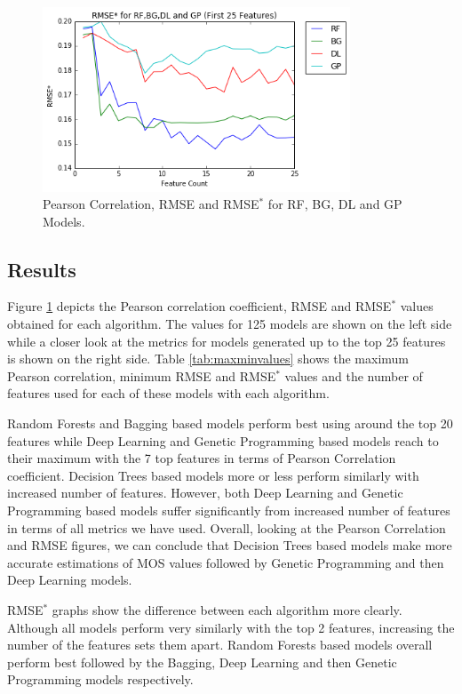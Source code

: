 \documentclass[journal]{IEEEtran}
\begin{document}
\begin{figure}[ht!]
\includegraphics[width=3.6in]{./epsilonrmsezoom.png}
\caption{Pearson Correlation, RMSE and RMSE$^*$ for RF, BG, DL and GP Models.}
\label{fig:all}
\vspace{-0.3cm}
\end{figure}

\vspace{-0.2cm}
\subsection{Results}

Figure \ref{fig:all} depicts the Pearson correlation coefficient, RMSE and RMSE$^*$ values obtained for each algorithm. The values for 125 models are shown on the left side while a closer look at the metrics for models generated up to the top 25 features is shown on the right side. Table \ref{tab:maxminvalues} shows the maximum Pearson correlation, minimum RMSE and RMSE$^*$ values and the number of features used for each of these models with each algorithm.

Random Forests and Bagging based models perform best using around the top 20 features while Deep Learning and Genetic Programming based models reach to their maximum with the 7 top features in terms of Pearson Correlation coefficient. Decision Trees based models more or less perform similarly with increased number of features. However, both Deep Learning and Genetic Programming based models suffer significantly from increased number of features in terms of all metrics we have used. Overall, looking at the Pearson Correlation and RMSE figures, we can conclude that Decision Trees based models make more accurate estimations of MOS values followed by Genetic Programming and then Deep Learning models. 

RMSE$^*$ graphs show the difference between each algorithm more clearly. Although all models perform very similarly with the top 2 features, increasing the number of the features sets them apart. Random Forests based models overall perform best followed by the Bagging, Deep Learning and then Genetic Programming models respectively.
\end{document}
